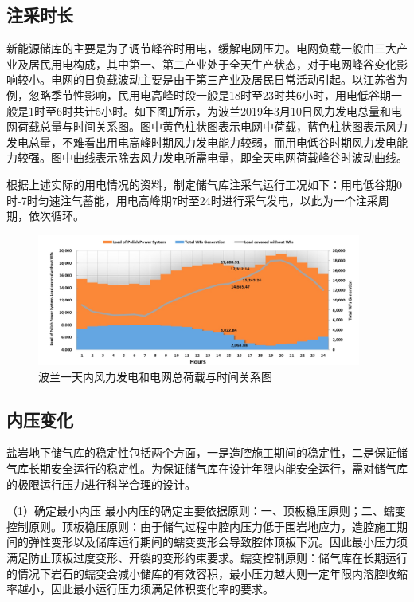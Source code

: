 \subsection{注采时长}
新能源储库的主要是为了调节峰谷时用电，缓解电网压力。电网负载一般由三大产业及居民用电构成，其中第一、第二产业处于全天生产状态，对于电网峰谷变化影响较小。电网的日负载波动主要是由于第三产业及居民日常活动引起。以江苏省为例，忽略季节性影响，民用电高峰时段一般是18时至23时共6小时，用电低谷期一般是1时至6时共计5小时\cite{谈康2016江苏电网负荷特性研究及有序用电管理措施探讨}。如下图\ref{fig:5-2}所示，为波兰2019年3月10日风力发电总量和电网荷载总量与时间关系图\cite{R2021Comprehensive}。图中黄色柱状图表示电网中荷载，蓝色柱状图表示风力发电总量，不难看出用电高峰时期风力发电能力较弱，而用电低谷时期风力发电能力较强。图中曲线表示除去风力发电所需电量，即全天电网荷载峰谷时波动曲线。

根据上述实际的用电情况的资料，制定储气库注采气运行工况如下：用电低谷期0时-7时匀速注气蓄能，用电高峰期7时至24时进行采气发电，以此为一个注采周期，依次循环\cite{谈康2016江苏电网负荷特性研究及有序用电管理措施探讨,R2021Comprehensive}。

\begin{figure}[ht!]
    \centering
    \includegraphics[width=0.95\textwidth]{img/chap5/波兰2019年某一天风力发电和电网总荷载与时间关系图.png}
    \caption{波兰一天内风力发电和电网总荷载与时间关系图\cite{R2021Comprehensive}}
    \label{fig:5-2}
\end{figure}


\subsection{内压变化}
盐岩地下储气库的稳定性包括两个方面，一是造腔施工期间的稳定性，二是保证储气库长期安全运行的稳定性。为保证储气库在设计年限内能安全运行，需对储气库的极限运行压力进行科学合理的设计。

（1）确定最小内压
最小内压的确定主要依据原则：一、顶板稳压原则；二、蠕变控制原则。顶板稳压原则：由于储气过程中腔内压力低于围岩地应力，造腔施工期间的弹性变形以及储库运行期间的蠕变变形会导致腔体顶板下沉。因此最小压力须满足防止顶板过度变形、开裂的变形约束要求。蠕变控制原则：储气库在长期运行的情况下岩石的蠕变会减小储库的有效容积，最小压力越大则一定年限内溶腔收缩率越小，因此最小运行压力须满足体积变化率的要求\cite{梁卫国2008层状盐岩储气库物理力学特性与极限运行压力}。

